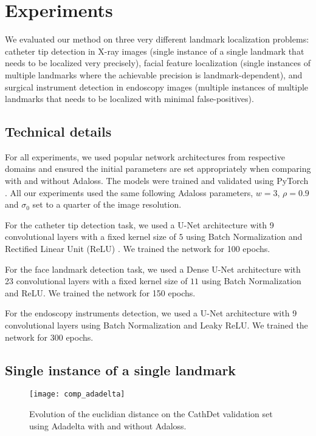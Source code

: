 \documentclass[10pt,twocolumn,letterpaper]{article}
\begin{document}
 

\section{Experiments}

We evaluated our method on three very different landmark localization problems: catheter tip detection in X-ray images (single instance of a single landmark that needs to be localized very precisely), facial feature localization (single instances of multiple landmarks where the achievable precision is landmark-dependent), and surgical instrument detection in endoscopy images (multiple instances of multiple landmarks that needs to be localized with minimal false-positives).

\subsection{Technical details}

For all experiments, we used popular network architectures from respective
domains and ensured the initial parameters
are set appropriately when comparing with and without Adaloss. The
models were trained and validated using PyTorch
\cite{paszke2017automatic}. All our experiments used the same following
Adaloss parameters, $w=3$, $\rho=0.9$ and $\sigma_0$ set to a quarter of the image resolution.
\par
For the catheter tip detection task, we used a U-Net architecture
\cite{unet} with 9 convolutional layers with a fixed kernel size of $5$ using Batch Normalization \cite{batchnorm} and Rectified Linear Unit (ReLU) \cite{relu}. 
We trained the network for 100 epochs.
\par
For the face landmark detection task, we used a Dense U-Net architecture
\cite{denseunet} with 23 convolutional layers with a fixed kernel size of $11$ using Batch Normalization and ReLU. We trained the network for 150 epochs.
\par
For the endoscopy instruments detection, we used a U-Net architecture
\cite{unet} with 9 convolutional layers using Batch Normalization and Leaky ReLU. 
We trained the network for 300 epochs.


\subsection{Single instance of a single landmark}

\begin{figure}[t]
  \centering
  \texttt{[image: comp\_adadelta]}
    \caption{Evolution of the euclidian distance on the
    CathDet validation set using Adadelta with and without
    Adaloss.
  }
  \label{fig:comp_adadelta}
\end{figure}
\end{document}
